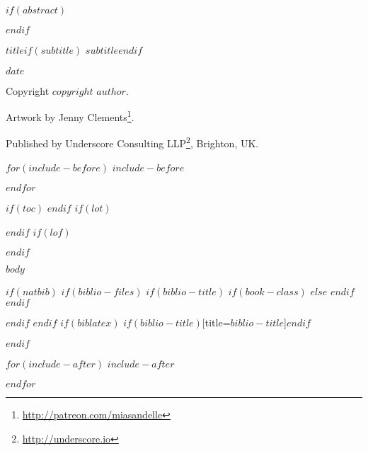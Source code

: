 \documentclass[$if(fontsize)$$fontsize$$else$12pt$endif$,$if(lang)$$lang$,$endif$$if(papersize)$$papersize$,$endif$$for(classoption)$$classoption$$sep$,$endfor$]{$documentclass$}
\renewcommand{\href}[2]{#2\footnote{\url{#1}}}
\begin{document}
\pagecolor{white}


\sloppy

$if(abstract)$
\begin{abstract}
$abstract$
\end{abstract}
$endif$


\vspace*{\fill}

\begin{center}

{\Large $title$$if(subtitle)$ $subtitle$$endif$}

$date$

Copyright $copyright$ $author$.

Artwork by \href{http://patreon.com/miasandelle}{Jenny Clements}.

Published by \href{http://underscore.io}{Underscore Consulting LLP}, Brighton, UK.

\end{center}

\vspace{1em}

$for(include-before)$
$include-before$

$endfor$

\vspace*{\fill}


$if(toc)$
{
\hypersetup{linkcolor=black}
\setcounter{tocdepth}{$if(toc-depth)$$toc-depth$$else$3$endif$}
\tableofcontents
}
$endif$
$if(lot)$
\listoftables
$endif$
$if(lof)$
\listoffigures
$endif$


$body$


$if(natbib)$
$if(biblio-files)$
$if(biblio-title)$
$if(book-class)$
\renewcommand\bibname{$biblio-title$}
$else$
\renewcommand\refname{$biblio-title$}
$endif$
$endif$


$endif$
$endif$
$if(biblatex)$
\printbibliography$if(biblio-title)$[title=$biblio-title$]$endif$

$endif$


$for(include-after)$
$include-after$

$endfor$

\end{document}
